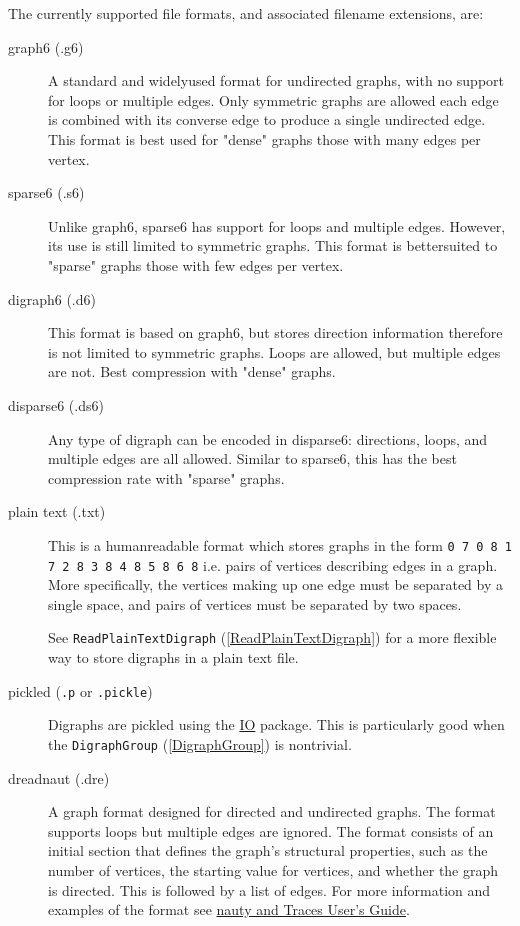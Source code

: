 \documentclass[a4paper,11pt]{report}
\begin{document}
{{{ The currently supported file formats, and associated filename extensions, are: 
\begin{description}
\item[{graph6 (.g6)}]  A standard and widely\texttt{}used format for undirected graphs,
with no support for loops or multiple edges. Only symmetric graphs are allowed
\texttt{}\texttt{} each edge is combined with its
converse edge to produce a single undirected edge. This format is best used
for "dense" graphs \texttt{}\texttt{} those with many
edges per vertex. 
\item[{sparse6 (.s6)}]  Unlike graph6, sparse6 has support for loops and multiple edges. However, its
use is still limited to symmetric graphs. This format is
better\texttt{}suited to "sparse" graphs
\texttt{}\texttt{} those with few edges per vertex. 
\item[{digraph6 (.d6)}]  This format is based on graph6, but stores direction information
\texttt{} therefore is not limited to symmetric graphs. Loops are
allowed, but multiple edges are not. Best compression with "dense" graphs. 
\item[{disparse6 (.ds6)}]  Any type of digraph can be encoded in disparse6: directions, loops, and
multiple edges are all allowed. Similar to sparse6, this has the best
compression rate with "sparse" graphs. 
\item[{plain text (.txt)}]  This is a human\texttt{}readable format which stores graphs in the
form \texttt{0 7 0 8 1 7 2 8 3 8 4 8 5 8 6 8} i.e. pairs of vertices describing edges in a graph. More specifically, the
vertices making up one edge must be separated by a single space, and pairs of
vertices must be separated by two spaces. 

 See \texttt{ReadPlainTextDigraph} (\ref{ReadPlainTextDigraph}) for a more flexible way to store digraphs in a plain text file. 

  
\item[{pickled (\texttt{.p} or \texttt{.pickle})}]  Digraphs are pickled using the \href{https://gap-packages.github.io/io} {IO}  package. This is particularly good when the \texttt{DigraphGroup} (\ref{DigraphGroup}) is non\texttt{}trivial. 

 
\item[{dreadnaut (.dre)}]  A graph format designed for directed and undirected graphs. The format
supports loops but multiple edges are ignored. The format consists of an
initial section that defines the graph's structural properties, such as the
number of vertices, the starting value for vertices, and whether the graph is
directed. This is followed by a list of edges. For more information and
examples of the format see \href{http://pallini.di.uniroma1.it/Guide.html} {nauty and Traces User's Guide}. 


\end{description}}}}
\end{document}

